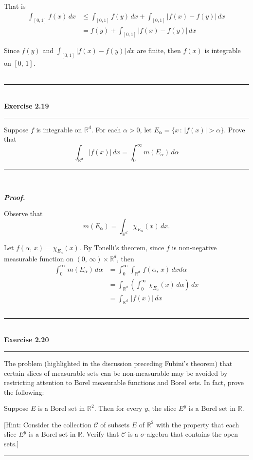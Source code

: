 \documentclass[a4paper,11pt]{article}
\begin{document}
That is
	$$\begin{aligned}
	\int_{[0,1]} f(x)\,dx
	&\leq \int_{[0,1]} f(y)\,dx + \int_{[0,1]} |f(x) - f(y)|\,dx\\
	&= f(y) +  \int_{[0,1]} |f(x) - f(y)|\,dx
	\end{aligned}$$

Since $f(y)$ and $\int_{[0,1]} |f(x) - f(y)|\,dx$ are finite, then $f(x)$ is integrable on $[0,\,1]$.\\\\



\begin{flushleft}
	\rule[-0.5ex]{17cm}{2pt}\\
		\textbf{Exercise 2.19}\\
	\rule[1.5ex]{17cm}{0.5pt}
		Suppose $f$ is integrable on $\mathbb{R}^d$. For each $\alpha > 0$, let $E_\alpha = \{x\,:\,|f(x)| > \alpha\}$. Prove that
			$$\int_{\mathbb{R}^d} |f(x)|\,dx
			= \int_0^\infty m(E_\alpha)\,d\alpha$$
	\rule[1.0ex]{17cm}{0.5pt}\
\end{flushleft}

\textbf{\textit{Proof.}}

Observe that
	$$m(E_\alpha) = \int_{\mathbb{R}^d} \chi_{E_\alpha}(x)\,dx.$$

Let $f(\alpha,\,x) = \chi_{E_\alpha}(x)$. By Tonelli's theorem, since $f$ is non-negative measurable function on $(0,\,\infty) \times \mathbb{R}^d$, then
	$$\begin{aligned}
	\int_0^\infty\,m(E_\alpha)\,d\alpha
	&= \int_0^\infty \int_{\mathbb{R}^d}\,f(\alpha,\,x)\,dxd\alpha\\
	&= \int_{\mathbb{R}^d} \left( \int_0^\infty\,\chi_{E_\alpha}(x)\,d\alpha\right)\,dx\\
	&= \int_{\mathbb{R}^d}\,|f(x)|\,dx\\\\\
	\end{aligned}$$



\newpage

\begin{flushleft}
	\rule[-0.5ex]{17cm}{2pt}\\
		\textbf{Exercise 2.20}\\
	\rule[1.5ex]{17cm}{0.5pt}
		The problem (highlighted in the discussion preceding Fubini’s theorem) that certain slices of measurable sets can be non-measurable may be avoided by restricting attention to Borel measurable functions and Borel sets. In fact, prove the following:

		\quad Suppose $E$ is a Borel set in $\mathbb{R}^2$. Then for every $y$, the slice $E^y$ is a Borel set in $\mathbb{R}$.

		[Hint: Consider the collection $\mathcal{C}$ of subsets $E$ of $\mathbb{R}^2$ with the property that each slice $E^y$ is a Borel set in $\mathbb{R}$. Verify that $\mathcal{C}$ is a $\sigma$-algebra that contains the open sets.]
	\rule[1.0ex]{17cm}{0.5pt}\
\end{flushleft}
\end{document}

